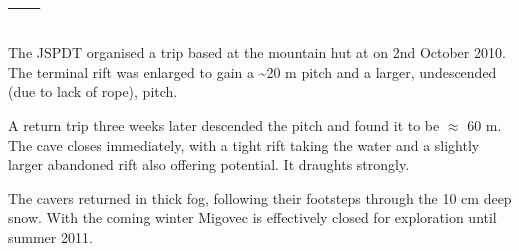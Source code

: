 \section{\texorpdfstring{ --- }{M2 --- Kavkna Jama}}

The JSPDT organised a trip based at the mountain hut at  on 2nd
October 2010. The terminal rift was enlarged to gain a
\textasciitilde 20 m pitch and a larger, undescended (due to lack of rope), pitch.

A return trip three weeks later descended the pitch and found it to be
\(\approx\) 60 m. The cave closes immediately, with a tight rift taking
the water and a slightly larger abandoned rift also offering potential.
It draughts strongly.

The  cavers returned in thick fog, following their footsteps
through the 10 cm deep snow. With the coming winter Migovec is
effectively closed for exploration until summer 2011.
